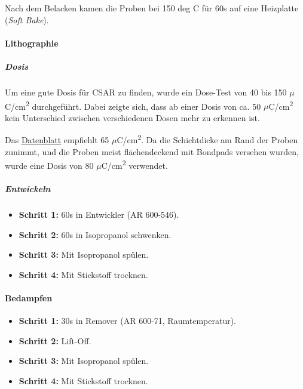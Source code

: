 \documentclass[
  paper=a4,
  ,captions=tableheading
]{scrartcl}
\providecommand{\tightlist}{%
  \setlength{\itemsep}{0pt}\setlength{\parskip}{0pt}}
\begin{document}
Nach dem Belacken kamen die Proben bei 150 deg C für 60s auf eine Heizplatte (\emph{Soft Bake}).

\hypertarget{lithographie}{%
\paragraph{Lithographie}\label{lithographie}}

\hypertarget{dosis}{%
\subparagraph{Dosis}\label{dosis}}

Um eine gute Dosis für CSAR zu finden, wurde ein Dose-Test von 40 bis 150 \(\mu\)C/cm\textsuperscript{2} durchgeführt. Dabei zeigte sich, dass ab einer Dosis von ca. 50 \(\mu\)C/cm\textsuperscript{2} kein Unterschied zwischen verschiedenen Dosen mehr zu erkennen ist.

Das \href{https://www.allresist.de/wp-content/uploads/2020/03/AR-P6200_CSAR62_Deutsch_Allresist_Produktinformation.pdf}{Datenblatt} empfiehlt 65 \(\mu\)C/cm\textsuperscript{2}. Da die Schichtdicke am Rand der Proben zunimmt, und die Proben meist flächendeckend mit Bondpads versehen wurden, wurde eine Dosis von 80 \(\mu\)C/cm\textsuperscript{2} verwendet.

\hypertarget{entwickeln}{%
\subparagraph{Entwickeln}\label{entwickeln}}

\begin{itemize}
\tightlist
\item
  \textbf{Schritt 1:} 60s in Entwickler (AR 600-546).
\item
  \textbf{Schritt 2:} 60s in Isopropanol schwenken.
\item
  \textbf{Schritt 3:} Mit Isopropanol spülen.
\item
  \textbf{Schritt 4:} Mit Stickstoff trocknen.
\end{itemize}

\hypertarget{bedampfen}{%
\paragraph{Bedampfen}\label{bedampfen}}

\begin{itemize}
\tightlist
\item
  \textbf{Schritt 1:} 30s in Remover (AR 600-71, Raumtemperatur).
\item
  \textbf{Schritt 2:} Lift-Off.
\item
  \textbf{Schritt 3:} Mit Isopropanol spülen.
\item
  \textbf{Schritt 4:} Mit Stickstoff trocknen.
\end{itemize}
\end{document}
